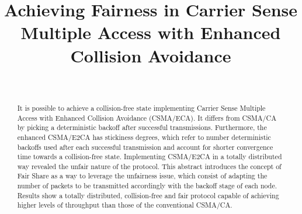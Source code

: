 \documentclass[conference]{IEEEtran}
\begin{document}
 \title{Achieving Fairness in Carrier Sense Multiple Access with Enhanced Collision Avoidance}


  \author{
      \\
  }



\maketitle

\begin{abstract}

\boldmath It is possible to achieve a collision-free state implementing Carrier Sense Multiple Access with Enhanced Collision Avoidance (CSMA/ECA). It differs from CSMA/CA by picking a deterministic backoff after successful transmissions. Furthermore, the enhanced CSMA/E2CA has stickiness degrees, which refer to number deterministic backoffs used after each successful transmission and account for shorter convergence time towards a collision-free state. Implementing CSMA/E2CA in a totally distributed way revealed the unfair nature of the protocol. This abstract introduces the concept of Fair Share as a way to leverage the unfairness issue, which consist of adapting the number of packets to be transmitted accordingly with the backoff stage of each node. Results show a totally distributed, collision-free and fair protocol capable of achieving higher levels of throughput than those of the conventional CSMA/CA.

\end{abstract}
\end{document}
